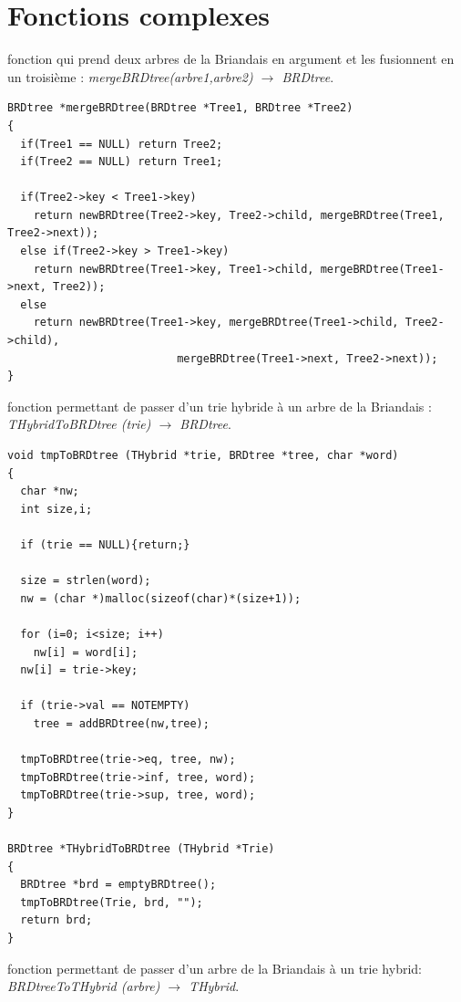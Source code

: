 \documentclass[a4paper,8pt]{report}
\begin{document}
\chapter{Fonctions complexes}

fonction qui prend deux arbres de la Briandais en argument et les fusionnent en un troisi\`eme : \textit{mergeBRDtree(arbre1,arbre2) $\rightarrow$ BRDtree}.
\begin{verbatim}
BRDtree *mergeBRDtree(BRDtree *Tree1, BRDtree *Tree2)
{
  if(Tree1 == NULL) return Tree2;
  if(Tree2 == NULL) return Tree1;
  
  if(Tree2->key < Tree1->key)
    return newBRDtree(Tree2->key, Tree2->child, mergeBRDtree(Tree1, Tree2->next));
  else if(Tree2->key > Tree1->key)
    return newBRDtree(Tree1->key, Tree1->child, mergeBRDtree(Tree1->next, Tree2));
  else
    return newBRDtree(Tree1->key, mergeBRDtree(Tree1->child, Tree2->child),
		                  mergeBRDtree(Tree1->next, Tree2->next));
}
\end{verbatim}

fonction permettant de passer d'un trie hybride \`a un arbre de la Briandais : \textit{THybridToBRDtree (trie) $\rightarrow$ BRDtree}.
\begin{verbatim}
void tmpToBRDtree (THybrid *trie, BRDtree *tree, char *word)
{
  char *nw;
  int size,i;
  
  if (trie == NULL){return;}
 
  size = strlen(word);
  nw = (char *)malloc(sizeof(char)*(size+1));
  
  for (i=0; i<size; i++)
    nw[i] = word[i];
  nw[i] = trie->key;
  
  if (trie->val == NOTEMPTY)
    tree = addBRDtree(nw,tree);
  
  tmpToBRDtree(trie->eq, tree, nw);
  tmpToBRDtree(trie->inf, tree, word);
  tmpToBRDtree(trie->sup, tree, word);
}

BRDtree *THybridToBRDtree (THybrid *Trie)
{
  BRDtree *brd = emptyBRDtree();
  tmpToBRDtree(Trie, brd, "");
  return brd;
}
\end{verbatim}

fonction permettant de passer d'un arbre de la Briandais \`a un trie hybrid: \textit{BRDtreeToTHybrid (arbre) $\rightarrow$ THybrid}.
\begin{verbatim}
\end{verbatim}
\end{document}
